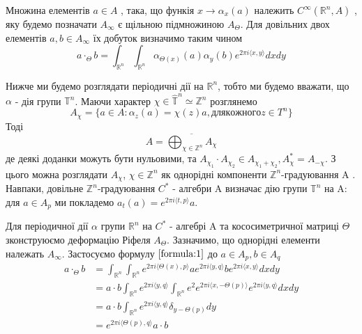 Множина елементів $a \in A$ , така, що функія $x \to \alpha_x(a)$ належить $C^\infty(\mathbb{R}^n, A)$
, яку будемо позначати $A_\infty$ є щільною  підмножиною $A_\Theta$.
Для довільних двох елементів $a,b \in A_\infty$ їх добуток визначимо таким чином
\begin{equation}\label{formula:1}
a \cdot_\Theta b = \int_{\mathbb{R}^n}\int_{\mathbb{R}^n}
\alpha_{\Theta(x)}(a) \alpha_y(b) e^{2 \pi i \langle x, y \rangle} dx dy
\end{equation}

Нижче ми будемо розглядати періодичні дії на $\mathbb{R}^n$, тобто
ми будемо вважати, що $\alpha$ - дія групи $\mathbb{T}^n$.
Маючи характер $\chi \in \hat{\mathbb{T}}^n \simeq \mathbb{Z}^n$ розглянемо
\begin{equation*}
    A_\chi = \{ a \in A : \alpha_z(a) = \chi(z)a, для кожного z \in T^n \}
\end{equation*}
Тоді
\begin{equation*}
    A = \overline{\bigoplus_{\chi \in \mathbb{Z}^n} A_\chi}
\end{equation*}
де деякі доданки можуть бути нульовими, та $A_{\chi_1} \cdot A_{\chi_2} \in A_{\chi_1 + \chi_2}, A_\chi^* = A_{-\chi}$.
З цього можна розглядати $A_\chi$, $\chi \in \mathbb{Z}^n$ як однорідні компоненти
$\mathbb{Z}^n$-градуювання A .
Навпаки, довільне $\mathbb{Z}^n$-градуювання $C^*$ - алгебри A визначає дію
групи $\mathbb{T}^n$ на A: для $a \in A_p$ ми покладемо $a_t(a) = e^{2\pi i \langle t, p \rangle} a$.

Для періодичної дії $\alpha$ групи $\mathbb{R}^n$ на $C^*$ - алгебрі A та кососиметричної
матриці $\Theta$ зконструюємо деформацію Ріфеля $A_\Theta$.
Зазначимо, що однорідні елементи належать $A_\infty$.
Застосуємо формулу $\ref{formula:1}$ до $a \in A_p, b \in A_q$
\begin{align*}
    a \cdot_\Theta b &= \int_{\mathbb{R}^n}\int_{\mathbb{R}^n} e^{2 \pi i \langle \Theta(x), p \rangle } a e^{2 \pi i \langle y, q \rangle } b e^{2 \pi i \langle x, y \rangle } dx dy \\
    &= a \cdot b \int_{\mathbb{R}^n} e^{2 \pi i \langle y, q \rangle } \int_{\mathbb{R}^n} e^{2} e^{2 \pi i \langle x, -\Theta(p) \rangle } e^{2 \pi i \langle y, q \rangle } dx dy \\
    &= a \cdot b \int_{\mathbb{R}^n} e^{2 \pi i \langle y, q \rangle} \delta_{y - \Theta(p)} dy \\
    &= e^{2 \pi i \langle \Theta(p), q \rangle} a \cdot b
\end{align*}

